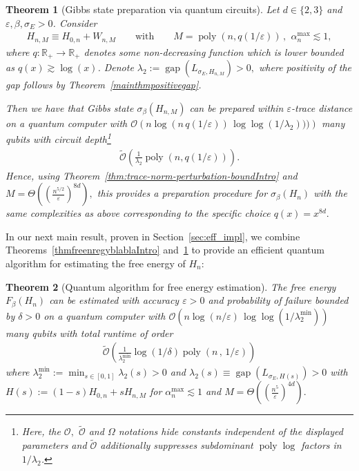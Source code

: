 \documentclass[11pt]{amsart}
\newcommand{\1}{\mathbbm{1}}
\newcommand{\R}{\mathbb{R}}
\newcommand{\eps}{\varepsilon}
\theoremstyle{plain}
\newtheorem{theorem}{Theorem}[section]
\theoremstyle{definition}
\theoremstyle{remark}
\numberwithin{equation}{section}
\begin{document}
\begin{theorem}[Gibbs state preparation via quantum circuits]
\label{thm:GibbsPrepareCoulombIntro}
Let $d\in\{2,3\}$ and \\ $\eps,\beta,\sigma_E>0$. Consider  
\begin{align*}
H_{n,M}\equiv H_{0,n} + W_{n,M} \qquad\text{with}\qquad M = \operatorname{poly}(n,q(1/\eps))\,, \ \, \alpha^{\max}_{n} \lesssim 1,
\end{align*} 
 where $q:\R_+\to \R_+$ denotes some non-decreasing function which is lower bounded as $q(x)\gtrsim \log(x)$.
Denote $\lambda_2 := \operatorname{gap}(L_{\sigma_E,H_{n,M}})>0,$ where positivity of the gap follows by Theorem~\ref{mainthmpositivegap}.

Then we have that Gibbs state $\sigma_\beta(H_{n,M})$ can be prepared within $\eps$-trace distance on a quantum computer with $\mathcal{O}\left(n\log (n\,q(1/\eps))\,\log\log(1/\lambda_2)))\right)$ many qubits with circuit depth\footnote{Here, the $\mathcal{O},$ $\widetilde{\mathcal{O}}$ and $\Omega$ notations hide constants independent of the displayed parameters and $\widetilde{\mathcal{O}}$ additionally suppresses subdominant $\operatorname{poly}\log$ factors in $1/\lambda_2$.}
\begin{align*}
  \widetilde{ \mathcal{O}}\left(\frac{1}{\lambda_2}\operatorname{poly}\left(n, q(1/\eps)\right)\right).
\end{align*}
Hence, using Theorem~\ref{thm:trace-norm-perturbation-boundIntro} and $M = \Theta\left(\left(\frac{n^{5/2}}{\eps}\right)^{8d}\right),$ this provides a preparation procedure for $\sigma_\beta(H_n)$ with the same complexities as above corresponding to the specific choice $q(x) = x^{8d}.$ 
\end{theorem}

In our next main result, proven in Section~\ref{sec:eff_impl}, we combine Theorems~\ref{thmfreenregyblablaIntro} and~\ref{thm:GibbsPrepareCoulombIntro} to provide an efficient quantum algorithm for estimating the free energy of $H_n:$
\begin{theorem}[Quantum algorithm for free energy estimation]
The free energy $F_\beta(H_n)$ can be estimated with accuracy $\eps>0$ and probability of failure bounded by $\delta>0$ on a quantum computer with $\mathcal{O}\left(n\log( n/\eps)\,\log\log(1/\lambda^{\min}_{2})\right)$ many qubits with total runtime of order 
\begin{align*}
    \widetilde{ \mathcal{O}}\left(\frac{1}{\lambda^{\min}_{2}}\log\left(1/\delta\right)\operatorname{poly}\left(n\,,\,1/\eps\right)\right)
\end{align*}
where $\lambda^{\min}_{2}:= \min_{s\in[0,1]} \lambda_2(s)>0$ and $\lambda_2(s)\equiv\operatorname{gap}(L_{\sigma_E,H(s)})>0$ with   $H(s):=(1-s)H_{0,n}+sH_{n,M}$ for $\alpha^{\max}_n\lesssim 1$ and $M=\Theta\left(\left(\frac{n^{5}}{\eps}\right)^{4d}\right).$ 
\end{theorem}
\end{document}
